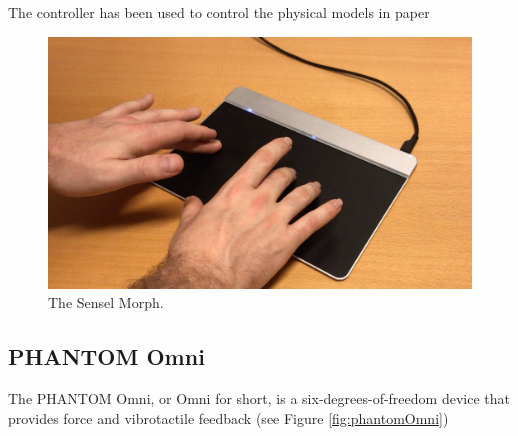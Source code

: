 The controller has been used to control the physical models in  paper

\begin{figure}[h]
    \centering
    \includegraphics[width=\textwidth]{figures/contributions/realtime/senselHands.jpg}
    \caption{The Sensel Morph. \label{fig:sensel}}
\end{figure}

\subsection{PHANTOM Omni}\label{sec:phantomOmni}
The PHANTOM Omni, or Omni for short, is a six-degrees-of-freedom device that provides force and vibrotactile feedback (see Figure \ref{fig:phantomOmni})